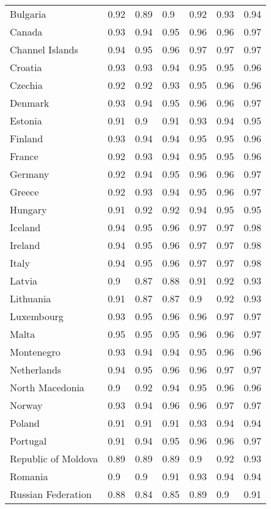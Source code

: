 \begin{longtable}[t]{lllllll}
Bulgaria & 0.92 & 0.89 & 0.9 & 0.92 & 0.93 & 0.94\\
Canada & 0.93 & 0.94 & 0.95 & 0.96 & 0.96 & 0.97\\
Channel Islands & 0.94 & 0.95 & 0.96 & 0.97 & 0.97 & 0.97\\
Croatia & 0.93 & 0.93 & 0.94 & 0.95 & 0.95 & 0.96\\
Czechia & 0.92 & 0.92 & 0.93 & 0.95 & 0.96 & 0.96\\
Denmark & 0.93 & 0.94 & 0.95 & 0.96 & 0.96 & 0.97\\
Estonia & 0.91 & 0.9 & 0.91 & 0.93 & 0.94 & 0.95\\
Finland & 0.93 & 0.94 & 0.94 & 0.95 & 0.95 & 0.96\\
France & 0.92 & 0.93 & 0.94 & 0.95 & 0.95 & 0.96\\
Germany & 0.92 & 0.94 & 0.95 & 0.96 & 0.96 & 0.97\\
Greece & 0.92 & 0.93 & 0.94 & 0.95 & 0.96 & 0.97\\
Hungary & 0.91 & 0.92 & 0.92 & 0.94 & 0.95 & 0.95\\
Iceland & 0.94 & 0.95 & 0.96 & 0.97 & 0.97 & 0.98\\
Ireland & 0.94 & 0.95 & 0.96 & 0.97 & 0.97 & 0.98\\
Italy & 0.94 & 0.95 & 0.96 & 0.97 & 0.97 & 0.98\\
Latvia & 0.9 & 0.87 & 0.88 & 0.91 & 0.92 & 0.93\\
Lithuania & 0.91 & 0.87 & 0.87 & 0.9 & 0.92 & 0.93\\
Luxembourg & 0.93 & 0.95 & 0.96 & 0.96 & 0.97 & 0.97\\
Malta & 0.95 & 0.95 & 0.95 & 0.96 & 0.96 & 0.97\\
Montenegro & 0.93 & 0.94 & 0.94 & 0.95 & 0.96 & 0.96\\
Netherlands & 0.94 & 0.95 & 0.96 & 0.96 & 0.97 & 0.97\\
North Macedonia & 0.9 & 0.92 & 0.94 & 0.95 & 0.96 & 0.96\\
Norway & 0.93 & 0.94 & 0.96 & 0.96 & 0.97 & 0.97\\
Poland & 0.91 & 0.91 & 0.91 & 0.93 & 0.94 & 0.94\\
Portugal & 0.91 & 0.94 & 0.95 & 0.96 & 0.96 & 0.97\\
Republic of Moldova & 0.89 & 0.89 & 0.89 & 0.9 & 0.92 & 0.93\\
Romania & 0.9 & 0.9 & 0.91 & 0.93 & 0.94 & 0.94\\
Russian Federation & 0.88 & 0.84 & 0.85 & 0.89 & 0.9 & 0.91\\

\end{longtable}
